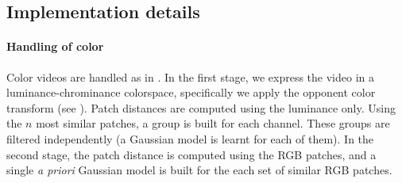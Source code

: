 \documentclass[10pt, journal, twocolumn, final, a4paper]{IEEEtran}
\begin{document}

\subsection{Implementation details}
\label{sse:implementation}

\paragraph{Handling of color} Color videos are handled as in \cite{Lebrun2013a}.
%
In the first stage, we express the video in a luminance-chrominance colorspace,
specifically we apply the opponent color transform (see \cite{Dabov2007tip,Lebrun2013a}).
Patch distances are computed using the luminance only. Using the 
$n$ most similar patches, a group is built for each channel. These
groups are filtered independently (a Gaussian model is learnt for each of them).
%
In the second stage, the patch distance is computed using the RGB patches, and
a single \textit{a priori} Gaussian model is built for the each set
of similar RGB patches. 
\end{document}
